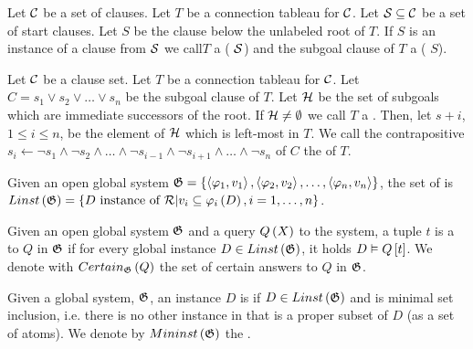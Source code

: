 \begin{defi}
Let $\mathcal{C}$ be a set of clauses. Let $T$ be a connection tableau for $\mathcal{C}$. Let $\mathcal{S}\subseteq \mathcal{C}$ be a set of start clauses. Let $S$ be the clause below the unlabeled root of $T$. If $S$ is an instance of a clause from $\mathcal{S}$ we call$T$ a  (\wrtTx{} $\mathcal{S}$) and the subgoal clause of $T$ a  (\wrtTx{} $S$).
\cite{conf/ijcai/Fuchs99}
\end{defi}

\begin{defi}
Let $\mathcal{C}$ be a clause set. Let $T$ be a connection tableau for $\mathcal{C}$. Let $C=s_1\vee s_2\vee\ldots\vee s_n$ be the subgoal clause of $T$. Let $\mathcal{H}$ be the set of subgoals which are immediate successors of the root. If $\mathcal{H}\neq\emptyset$ we call $T$ a . Then, let $s+i$, $1\leq i\leq n$, be the element of $\mathcal{H}$ which is left-most in $T$. We call the contrapositive $s_i\leftarrow\neg s_1\wedge\neg s_2\wedge\ldots\wedge\neg s_{i-1}\wedge\neg s_{i+1}\wedge\ldots\wedge\neg s_n$ of $C$ the  of $T$.
\cite{conf/ijcai/Fuchs99}
\end{defi}

\begin{defi}
Given an open global system $\mathfrak{G}=\left\{ \left\langle \varphi_1,v_1\right\rangle,\left\langle \varphi_2,v_2\right\rangle,\ldots,\left\langle \varphi_n,v_n\right\rangle\right\}$, the set of  is $Linst\left(\mathfrak{G}\right)=\left\{ D\mbox{ instance of }\mathcal{R}|v_i\subseteq\varphi_i\left(D\right),i=1,\ldots,n\right\}$.
\cite{conf/ijcai/BravoB03}
\end{defi}

\begin{defi}
Given an open global system $\mathfrak{G}$ and a query $Q\left(X\right)$ to the system, a tuple $t$ is a  to $Q$ in $\mathfrak{G}$ if for every global instance $D\in Linst\left(\mathfrak{G}\right)$, it holds $D\vDash Q\left[ t\right]$. We denote with $Certain_{\mathfrak{G}}\left(Q\right)$ the set of certain answers to $Q$ in $\mathfrak{G}$.
\cite{conf/ijcai/BravoB03}
\end{defi}

\begin{defi}
Given a global system, $\mathfrak{G}$, an instance $D$ is  if $D\in Linst\left(\mathfrak{G}\right)$ and is minimal \wrtTx{} set inclusion, i.e. there is no other instance in  that is a proper subset of $D$ (as a set of atoms). We denote by $Mininst\left(\mathfrak{G}\right)$ the .
\cite{conf/ijcai/BravoB03}
\end{defi}

